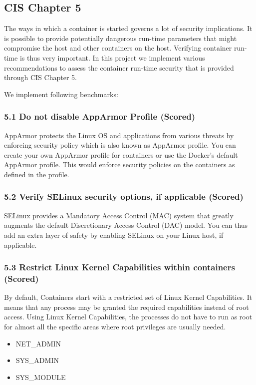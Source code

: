\subsection*{CIS Chapter 5}
The ways in which a container is started governs a lot of security implications. It is possible
to provide potentially dangerous run-time parameters that might compromise the host and
other containers on the host. Verifying container run-time is thus very important. In this project we implement various
recommendations to assess the container run-time security that is provided through CIS Chapter 5.

We implement following benchmarks: 

 \subsubsection*{5.1 Do not disable AppArmor Profile (Scored)} 
AppArmor protects the Linux OS and applications from various threats by enforcing
security policy which is also known as AppArmor profile. You can create your own
AppArmor profile for containers or use the Docker's default AppArmor profile. This would
enforce security policies on the containers as defined in the profile.

\subsubsection*{5.2 Verify SELinux security options, if applicable (Scored)} SELinux provides a Mandatory Access Control (MAC) system that greatly augments the
default Discretionary Access Control (DAC) model. You can thus add an extra layer of safety
by enabling SELinux on your Linux host, if applicable.

\subsubsection*{5.3 Restrict Linux Kernel Capabilities within containers (Scored)} By default, Containers start with a restricted set of Linux Kernel Capabilities. It
means that any process may be granted the required capabilities instead of root access.
Using Linux Kernel Capabilities, the processes do not have to run as root for almost all the
specific areas where root privileges are usually needed. 
\begin{itemize}
    \item NET\_ADMIN
    \item SYS\_ADMIN
    \item SYS\_MODULE
\end{itemize}

